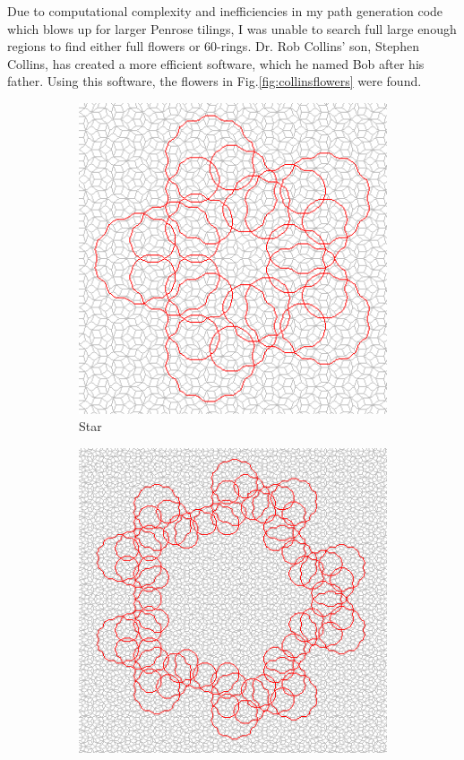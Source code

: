 \documentclass[
  oneside,
  11pt, a4paper,
  footinclude=true,
  headinclude=true,
  cleardoublepage=empty
]{scrbook}
\begin{document}
Due to computational complexity and inefficiencies in my path generation code which blows up for larger Penrose tilings, I was unable to search full large enough regions to find either full flowers or 60-rings. Dr. Rob Collins' son, Stephen Collins, has created a more efficient software, which he named Bob after his father. Using this software, the flowers in Fig.\ref{fig:collinsflowers} were found.
\begin{figure}[H]
\centering
\begin{subfigure}[b]{0.45\textwidth}
\includegraphics[width=\textwidth]{Star}
\caption[Star]{Star}
\end{subfigure}\hfill
\begin{subfigure}[b]{0.45\textwidth}
\includegraphics[width=\textwidth]{Pentagon}

\end{subfigure}
\end{figure}
\end{document}
